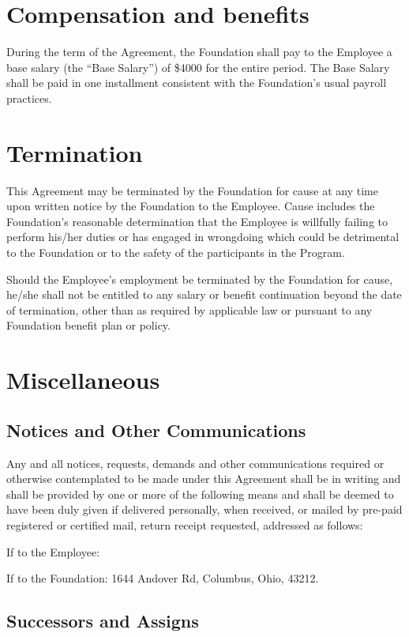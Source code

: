 \documentclass{ross}
\begin{document}
\section{Compensation and benefits}

During the term of the Agreement, the Foundation shall pay to the
Employee a base salary (the ``Base Salary'') of \$4000 for the entire
period.  The Base Salary shall be paid in one installment consistent with
the Foundation's usual payroll practices.

\section{Termination}

This Agreement may be terminated by the Foundation for cause at any time upon written notice by the Foundation to the Employee.  Cause includes the Foundation's reasonable determination that the Employee is willfully failing to perform his/her duties or has engaged in wrongdoing which could be detrimental to the Foundation or to the safety of the participants in the Program.

Should the Employee's employment be terminated by the Foundation for cause, he/she shall not be entitled to any salary or benefit continuation beyond the date of termination, other than as required by applicable law or pursuant to any Foundation benefit plan or policy.

\section{Miscellaneous}

\subsection{Notices and Other Communications}

Any and all notices, requests, demands and other communications required or otherwise contemplated to be made under this Agreement shall be in writing and shall be provided by one or more of the following means and shall be deemed to have been duly given  if delivered personally, when received, or mailed by pre-paid registered or certified mail, return receipt requested, addressed as follows:

If to the Employee: 

If to the Foundation: 1644 Andover Rd, Columbus, Ohio, 43212.

\subsection{Successors and Assigns}
\end{document}
